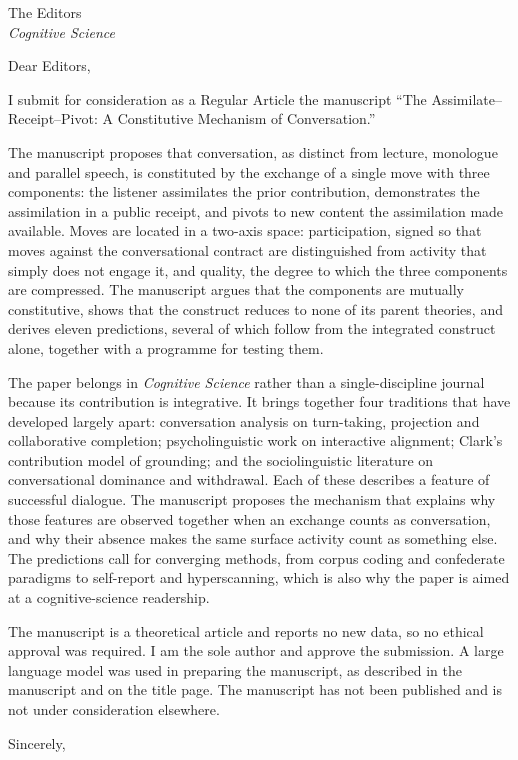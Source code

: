 \documentclass[11pt]{letter}
\date{\today}
\begin{document}
\begin{letter}{The Editors\\
\textit{Cognitive Science}}
\opening{Dear Editors,}

I submit for consideration as a Regular Article the manuscript ``The Assimilate--Receipt--Pivot: A Constitutive Mechanism of Conversation.''

The manuscript proposes that conversation, as distinct from lecture, monologue and parallel speech, is constituted by the exchange of a single move with three components: the listener assimilates the prior contribution, demonstrates the assimilation in a public receipt, and pivots to new content the assimilation made available. Moves are located in a two-axis space: participation, signed so that moves against the conversational contract are distinguished from activity that simply does not engage it, and quality, the degree to which the three components are compressed. The manuscript argues that the components are mutually constitutive, shows that the construct reduces to none of its parent theories, and derives eleven predictions, several of which follow from the integrated construct alone, together with a programme for testing them.

The paper belongs in \textit{Cognitive Science} rather than a single-discipline journal because its contribution is integrative. It brings together four traditions that have developed largely apart: conversation analysis on turn-taking, projection and collaborative completion; psycholinguistic work on interactive alignment; Clark's contribution model of grounding; and the sociolinguistic literature on conversational dominance and withdrawal. Each of these describes a feature of successful dialogue. The manuscript proposes the mechanism that explains why those features are observed together when an exchange counts as conversation, and why their absence makes the same surface activity count as something else. The predictions call for converging methods, from corpus coding and confederate paradigms to self-report and hyperscanning, which is also why the paper is aimed at a cognitive-science readership.

The manuscript is a theoretical article and reports no new data, so no ethical approval was required. I am the sole author and approve the submission. A large language model was used in preparing the manuscript, as described in the manuscript and on the title page. The manuscript has not been published and is not under consideration elsewhere.

\closing{Sincerely,}
\end{letter}
\end{document}
